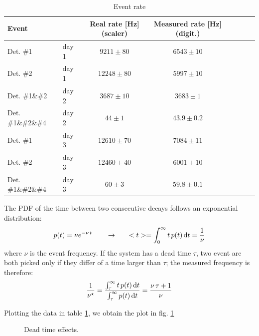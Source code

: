 \documentclass[11pt,a4 paper]{article}
\let\oldfrac\frac
\renewcommand{\frac}[3][d]{\ifthenelse{\equal{#1}{d}}{\oldfrac{#2}{#3}}{\nicefrac{#2}{#3}}}
\begin{document}
\begin{table}[H]
    \centering
    \begin{tabular}{llcccccc}
        \toprule
        Event && Real rate [\si{Hz}] (scaler)& Measured rate [\si{Hz}] (digit.) \\
        \midrule
        Det. \#1 &day 1& $9211 \pm 80$ & $6543 \pm 10$ \\
        Det. \#2 &day 1& $12248 \pm 80$ & $5997 \pm 10$\\
        Det. \#1\&\#2 &day 2& $3687 \pm 10$ & $3683 \pm 1$ \\
        Det. \#1\&\#2\&\#4 &day 2& $44 \pm 1$ & $43.9 \pm 0.2$ \\
        Det. \#1 &day 3& $12610 \pm 70$ & $7084 \pm 11$ \\
        Det. \#2 &day 3& $12460 \pm 40$ & $6001 \pm 10$ \\
        Det. \#1\&\#2\&\#4 &day 3& $60 \pm 3$ & $59.8 \pm 0.1$ \\
        \bottomrule
    \end{tabular}
    \caption{Event rate}
    \label{tab:rate}
\end{table}

The PDF of the time between two consecutive decays follows an exponential distribution:
\begin{equation*}
    p(t) = \nu e^{-\nu \,t} \qquad \rightarrow \qquad <t> = \int_0^{\infty} t\,p(t) \dd{t} = \frac{1}{\nu}
\end{equation*}
where $\nu$ is the event frequency. If the system has a dead time $\tau$, two event are both picked only if they differ of a time larger than $\tau$; the measured frequency is therefore:
\begin{equation*}
    \frac{1}{\nu^\star} = \frac{\int_{\tau}^{\infty} t \,p(t) \dd{t}}{\int_{\tau}^{\infty} p(t) \dd{t}} =\frac{\nu\,\tau + 1}{\nu}
\end{equation*}

Plotting the data in table \ref{tab:rate}, we obtain the plot in fig. \ref{fig:deadtime}

\begin{figure}
    \centering
     \quad
    \caption{Dead time effects.}
    \label{fig:deadtime}
\end{figure}
\end{document}
